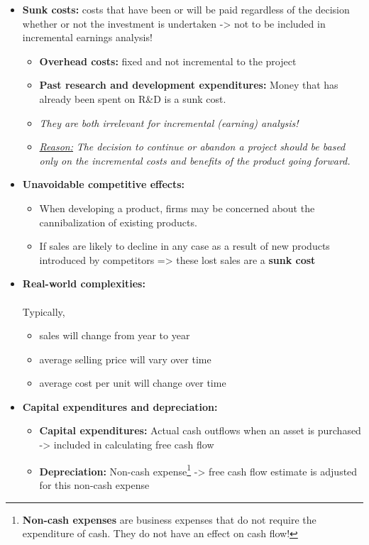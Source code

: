 \documentclass[ieeetran]{article}
\begin{document}
\begin{itemize}
\item \textbf{Sunk costs:} costs that have been or will be paid regardless of the decision whether or not the investment is undertaken -> not to be included in incremental earnings analysis!
	\begin{itemize}
	  \item \textbf{Overhead costs:} fixed and not incremental to the project
	  \item \textbf{Past research and development expenditures:} Money that has already been spent on R\&D is a sunk cost.
  \item \textit{They are both irrelevant for incremental (earning) analysis!} 
	  \item \underline{\textit{Reason:}} \textit{The decision to continue or abandon a project should be based only on the incremental costs and benefits of the product going forward.}
	\end{itemize}

\item \textbf{Unavoidable competitive effects:}
	\begin{itemize}
	  \item When developing a product, firms may be concerned about the cannibalization of existing products.
	\item If sales are likely to decline in any case as a result of new products introduced by competitors => these lost sales are a \textbf{sunk cost}
	\end{itemize}

\item \textbf{Real-world complexities:}\\
	\\Typically,
	\begin{itemize}
	  \item sales will change from year to year
	\item average selling price will vary over time
        \item average cost per unit will change over time
	\end{itemize}

\item \textbf{Capital expenditures and depreciation:}
	\begin{itemize}
	  \item \textbf{Capital expenditures:} Actual cash outflows when an asset is purchased -> included in calculating free cash flow
	  \item \textbf{Depreciation:} Non-cash expense\footnote{\textbf{Non-cash expenses} are business expenses that do not require the expenditure of cash. They do not have an effect on cash flow!} -> free cash flow estimate is adjusted for this non-cash expense
	\end{itemize}


\end{itemize}
\end{document}
